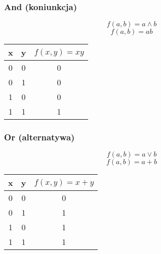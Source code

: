 \begin{paracol}{2}
\vspace*{\fill}
\subsubsection{And (koniunkcja)}
\[f(a,b) = a \land b\]
\[f(a,b) = ab\]
\begin{center}
    \begin{tabular}{| c  c | c |}
        \hline
        x & y & $f(x,y) = xy$ \\ 
        \hline
        0 & 0 & 0 \\ 
        0 & 1 & 0 \\ 
        1 & 0 & 0 \\ 
        1 & 1 & 1 \\ 
        \hline 
    \end{tabular}
\end{center}
\vspace*{\fill}
\switchcolumn
\vspace*{\fill}
\subsubsection{Or (alternatywa)}
\[f(a,b) = a \lor b\]
\[f(a,b) = a + b\]
\begin{center}
    \begin{tabular}{| c  c | c |}
        \hline
        x & y & $f(x,y) = x + y$ \\ 
        \hline
        0 & 0 & 0 \\ 
        0 & 1 & 1 \\ 
        1 & 0 & 1 \\ 
        1 & 1 & 1 \\ 
        \hline 
    \end{tabular}
\end{center}
\vspace*{\fill}
\end{paracol}
